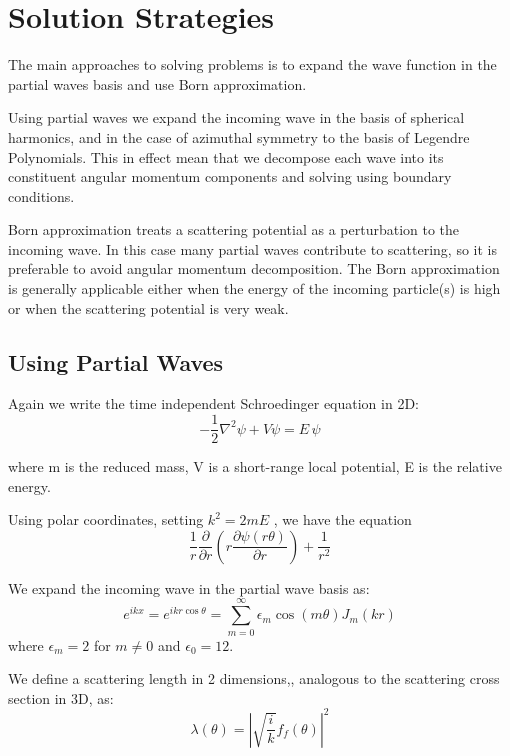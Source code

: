 \section{Solution Strategies}
The main approaches to solving problems is to expand the wave function in the partial waves basis and use Born approximation.

Using partial waves  we expand the incoming wave in the basis of spherical harmonics, and in the case of azimuthal symmetry to the basis of Legendre Polynomials. This in effect mean that we decompose each wave into its constituent angular momentum components and solving using boundary conditions.

Born approximation \cite{GQuantum} treats a scattering potential as a perturbation to the incoming wave. In this case many partial waves contribute to scattering, so it is preferable to avoid angular momentum decomposition. The Born approximation is generally applicable either when the energy of the incoming particle(s) is high or when the scattering potential is very weak. 

\subsection{Using Partial Waves}

Again we write the time independent Schroedinger equation in 2D:
\begin{equation}
  -\frac{1}{2}\nabla^2\psi + V\psi = E\,\psi
\end{equation}

where m is the reduced mass, V is a short-range local potential, E is the relative energy.

Using polar coordinates, setting $ k^2 = 2mE $ , we have the equation
\begin{equation}
    \frac{1}{r}\frac{\partial}{\partial r}\left(r\frac{\partial\psi(r\theta)}{\partial r}\right) + \frac{1}{r^2}
\end{equation}

We expand the incoming wave in the partial wave basis as:
\begin{equation}
    e^{ikx} = e^{ikr\cos\theta} = \sum_{m=0}^{\infty}{\epsilon_m \cos(m\theta)J_m(kr)}
\end{equation}
where $\epsilon_m = 2 $ for $ m \ne 0 $ and $\epsilon_0 = 12 $.


We define a scattering length in 2 dimensions,, analogous to the scattering cross section in 3D, as:
\begin{equation}\label{scatterL}
  \lambda(\theta) = |\sqrt{\frac{i}{k}}f_f(\theta)|^2
\end{equation}

